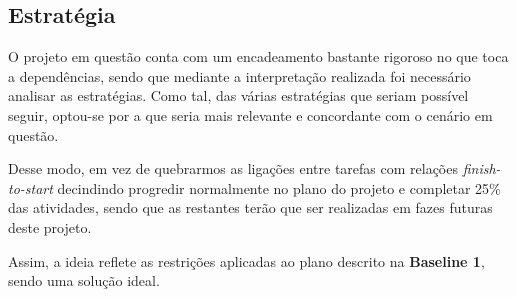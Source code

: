 \subsection{Estratégia}

O projeto em questão conta com um encadeamento bastante rigoroso no que toca a dependências, sendo que mediante a interpretação realizada foi necessário analisar as estratégias. Como tal, das várias estratégias que seriam possível seguir, optou-se por a que seria mais relevante e concordante com o cenário em questão.

Desse modo, em vez de quebrarmos as ligações entre tarefas com relações \textit{finish-to-start} decindindo progredir normalmente no plano do projeto e completar 25\% das atividades, sendo que as restantes terão que ser realizadas em fazes futuras deste projeto.

Assim, a ideia reflete as restrições aplicadas ao plano descrito na \textbf{Baseline 1}, sendo uma solução ideal.